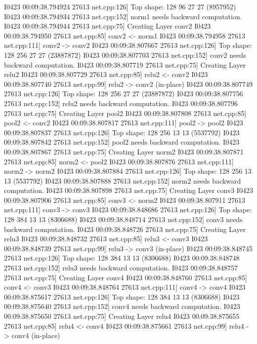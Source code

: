 \documentclass{article}
\begin{document}
I0423 00:09:38.794924 27613 net.cpp:126] Top shape: 128 96 27 27 (8957952)
I0423 00:09:38.794934 27613 net.cpp:152] norm1 needs backward computation.
I0423 00:09:38.794944 27613 net.cpp:75] Creating Layer conv2
I0423 00:09:38.794950 27613 net.cpp:85] conv2 <- norm1
I0423 00:09:38.794958 27613 net.cpp:111] conv2 -> conv2
I0423 00:09:38.807667 27613 net.cpp:126] Top shape: 128 256 27 27 (23887872)
I0423 00:09:38.807703 27613 net.cpp:152] conv2 needs backward computation.
I0423 00:09:38.807719 27613 net.cpp:75] Creating Layer relu2
I0423 00:09:38.807729 27613 net.cpp:85] relu2 <- conv2
I0423 00:09:38.807740 27613 net.cpp:99] relu2 -> conv2 (in-place)
I0423 00:09:38.807749 27613 net.cpp:126] Top shape: 128 256 27 27 (23887872)
I0423 00:09:38.807756 27613 net.cpp:152] relu2 needs backward computation.
I0423 00:09:38.807796 27613 net.cpp:75] Creating Layer pool2
I0423 00:09:38.807808 27613 net.cpp:85] pool2 <- conv2
I0423 00:09:38.807817 27613 net.cpp:111] pool2 -> pool2
I0423 00:09:38.807837 27613 net.cpp:126] Top shape: 128 256 13 13 (5537792)
I0423 00:09:38.807842 27613 net.cpp:152] pool2 needs backward computation.
I0423 00:09:38.807867 27613 net.cpp:75] Creating Layer norm2
I0423 00:09:38.807871 27613 net.cpp:85] norm2 <- pool2
I0423 00:09:38.807876 27613 net.cpp:111] norm2 -> norm2
I0423 00:09:38.807884 27613 net.cpp:126] Top shape: 128 256 13 13 (5537792)
I0423 00:09:38.807888 27613 net.cpp:152] norm2 needs backward computation.
I0423 00:09:38.807898 27613 net.cpp:75] Creating Layer conv3
I0423 00:09:38.807906 27613 net.cpp:85] conv3 <- norm2
I0423 00:09:38.807911 27613 net.cpp:111] conv3 -> conv3
I0423 00:09:38.848686 27613 net.cpp:126] Top shape: 128 384 13 13 (8306688)
I0423 00:09:38.848714 27613 net.cpp:152] conv3 needs backward computation.
I0423 00:09:38.848726 27613 net.cpp:75] Creating Layer relu3
I0423 00:09:38.848732 27613 net.cpp:85] relu3 <- conv3
I0423 00:09:38.848739 27613 net.cpp:99] relu3 -> conv3 (in-place)
I0423 00:09:38.848745 27613 net.cpp:126] Top shape: 128 384 13 13 (8306688)
I0423 00:09:38.848748 27613 net.cpp:152] relu3 needs backward computation.
I0423 00:09:38.848757 27613 net.cpp:75] Creating Layer conv4
I0423 00:09:38.848760 27613 net.cpp:85] conv4 <- conv3
I0423 00:09:38.848764 27613 net.cpp:111] conv4 -> conv4
I0423 00:09:38.875617 27613 net.cpp:126] Top shape: 128 384 13 13 (8306688)
I0423 00:09:38.875640 27613 net.cpp:152] conv4 needs backward computation.
I0423 00:09:38.875650 27613 net.cpp:75] Creating Layer relu4
I0423 00:09:38.875655 27613 net.cpp:85] relu4 <- conv4
I0423 00:09:38.875661 27613 net.cpp:99] relu4 -> conv4 (in-place)
\end{document}
